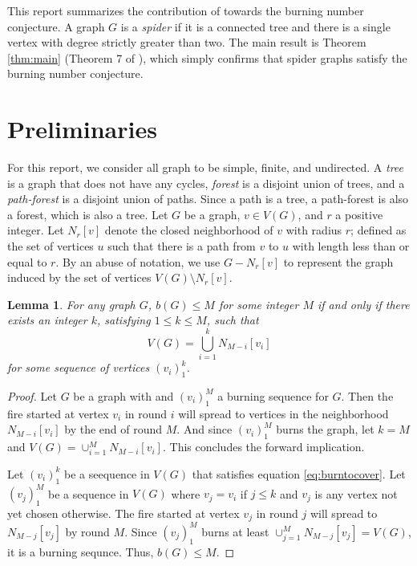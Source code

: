 \documentclass[12pt]{article}
\newtheorem{lemma}[theorem]{Lemma}
\begin{document}
This report summarizes the contribution of \cite{burning_spiders} towards the burning number conjecture.
A graph $G$ is a \textit{spider} if it is a connected tree and there is a single vertex with degree strictly greater than two.
The main result is Theorem \ref{thm:main} (Theorem 7 of \cite{burning_spiders}), which simply confirms that spider graphs satisfy the burning number conjecture. 

\section{Preliminaries}
For this report, we consider all graph to be simple, finite, and undirected.
A \textit{tree} is a graph that does not have any cycles, \textit{forest} is a disjoint union of trees, and a \textit{path-forest} is a disjoint union of paths.
Since a path is a tree, a path-forest is also a forest, which is also a tree.
Let $G$ be a graph, $v \in V(G)$, and $r$ a positive integer.
Let $N_{r}[v]$ denote the closed neighborhood of $v$ with radius $r$; defined as the set of vertices $u$ such that there is a path from $v$ to $u$ with length less than or equal to $r$.
By an abuse of notation, we use $G - N_r[v]$ to represent the graph induced by the set of vertices $V(G) \setminus N_r[v]$. 


\begin{lemma} \label{lem:burntocover}
    For any graph $G$, $b(G) \leq M$ for some integer $M$ if and only if there exists an integer $k$, satisfying $1 \leq k \leq M$, such that
    \begin{equation}
        V(G) = \bigcup_{i = 1}^k N_{M-i}[v_i] \label{eq:burntocover}
    \end{equation}
    for some sequence of vertices $(v_i)_1^k$.
\end{lemma}

\begin{proof}
    Let $G$ be a graph with and $(v_i)_1^M$ a burning sequence for $G$.
    Then the fire started at vertex $v_i$ in round $i$ will spread to vertices in the neighborhood $N_{M-i}[v_i]$ by the end of round $M$.
    And since $(v_i)_1^M$ burns the graph, let $k = M$ and $V(G) = \cup_{i=1}^M N_{M-i}[v_i]$.
    This concludes the forward implication.

    Let $(v_i)_1^k$ be a seequence in $V(G)$ that satisfies equation \ref{eq:burntocover}.
    Let $(v_j)_1^M$ be a sequence in $V(G)$ where $v_j = v_i$ if $j \leq k$ and $v_j$ is any vertex not yet chosen otherwise.
    The fire started at vertex $v_j$ in round $j$ will spread to $N_{M-j}[v_j]$ by round $M$.
    Since $(v_j)_1^M$ burns at least $\cup_{j=1}^M N_{M-j}[v_j] = V(G)$, it is a burning sequnce.
    Thus, $b(G) \leq M$.
\end{proof}
\end{document}
